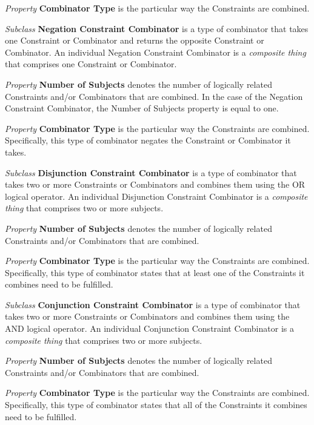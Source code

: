 \begin{description}
\textit{Property} \textbf{Combinator Type} is the particular way the Constraints are combined.


\item\textit{Subclass} \textbf{Negation Constraint Combinator} is a type of combinator that takes one Constraint or Combinator and returns the opposite Constraint or Combinator. An individual Negation Constraint Combinator is a \textit{composite thing} that comprises one Constraint or Combinator.

\textit{Property} \textbf{Number of Subjects} denotes the number of logically related Constraints and/or Combinators that are combined. In the case of the Negation Constraint Combinator, the Number of Subjects property is equal to one.

\textit{Property} \textbf{Combinator Type} is the particular way the Constraints are combined. Specifically, this type of combinator negates the Constraint or Combinator it takes.


\item\textit{Subclass} \textbf{Disjunction Constraint Combinator} is a type of combinator that takes two or more Constraints or Combinators and combines them using the OR logical operator. An individual Disjunction Constraint Combinator is a \textit{composite thing} that comprises two or more subjects.

\textit{Property} \textbf{Number of Subjects} denotes the number of logically related Constraints and/or Combinators that are combined.

\textit{Property} \textbf{Combinator Type} is the particular way the Constraints are combined. Specifically, this type of combinator states that at least one of the Constraints it combines need to be fulfilled.


\item\textit{Subclass} \textbf{Conjunction Constraint Combinator} is a type of combinator that takes two or more Constraints or Combinators and combines them using the AND logical operator. An individual Conjunction Constraint Combinator is a \textit{composite thing} that comprises two or more subjects.

\textit{Property} \textbf{Number of Subjects} denotes the number of logically related Constraints and/or Combinators that are combined.

\textit{Property} \textbf{Combinator Type} is the particular way the Constraints are combined. Specifically, this type of combinator states that all of the Constraints it combines need to be fulfilled.







\end{description}
